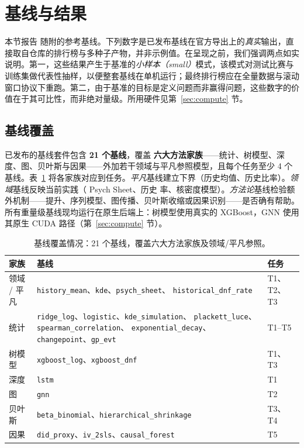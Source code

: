 \section{基线与结果}
\label{sec:results}

本节报告 \wcabench{} 随附的参考基线。下列数字是已发布基线在官方导出上的\emph{真实}输出，直接取自仓库的排行榜与多种子产物，并非示例值。在呈现之前，我们强调两点如实说明。第一，这些结果产生于基准的\emph{小样本（small）}模式，该模式对测试比赛与训练集做代表性抽样，以便整套基线在单机运行；最终排行榜应在全量数据与滚动窗口协议下重跑。第二，由于基准的目标是定义问题而非赢得问题，这些数字的价值在于其可比性，而非绝对量级。所用硬件见第~\ref{sec:compute} 节。

\subsection{基线覆盖}
\label{sec:results-taxonomy}

已发布的基线套件包含 \textbf{21 个基线}，覆盖 \textbf{六大方法家族}——统计、树模型、深度、图、贝叶斯与因果——外加若干领域与平凡参照模型，且每个任务至少 4 个基线。表~\ref{tab:coverage} 将各家族对应到任务。\emph{平凡}基线建立下界（历史均值、历史比率）。\emph{领域}基线反映当前实践（\wca{} Psych Sheet、历史 \DNF{} 率、核密度模型）。\emph{方法论}基线检验额外机制——提升、序列模型、图传播、贝叶斯收缩或因果识别——是否确有帮助。所有重量级基线现均运行在原生后端上：树模型使用真实的 XGBoost，GNN 使用其原生 CUDA 路径（第~\ref{sec:compute} 节）。

\begin{table}[t]
  \centering
  \small
  \begin{threeparttable}
  \caption{基线覆盖情况：21 个基线，覆盖六大方法家族及领域/平凡参照。}
  \label{tab:coverage}
  \begin{tabular}{@{}p{2.2cm}p{8.4cm}p{2.6cm}@{}}
    \toprule
    家族 & 基线 & 任务 \\
    \midrule
    领域 / 平凡 & \texttt{history\_mean}、\texttt{kde}、\texttt{psych\_sheet}、
                       \texttt{historical\_dnf\_rate} & T1、T2、T3 \\
    统计 & \texttt{ridge\_log}、\texttt{logistic}、\texttt{kde\_simulation}、
                  \texttt{plackett\_luce}、\texttt{spearman\_correlation}、
                  \texttt{exponential\_decay}、\texttt{changepoint}、\texttt{gp\_evt} & T1--T5 \\
    树模型 & \texttt{xgboost\_log}、\texttt{xgboost\_dnf} & T1、T3 \\
    深度 & \texttt{lstm} & T1 \\
    图 & \texttt{gnn} & T2 \\
    贝叶斯 & \texttt{beta\_binomial}、\texttt{hierarchical\_shrinkage} & T3、T4 \\
    因果 & \texttt{did\_proxy}、\texttt{iv\_2sls}、\texttt{causal\_forest} & T5 \\
    \bottomrule
  \end{tabular}
  \end{threeparttable}
\end{table}

